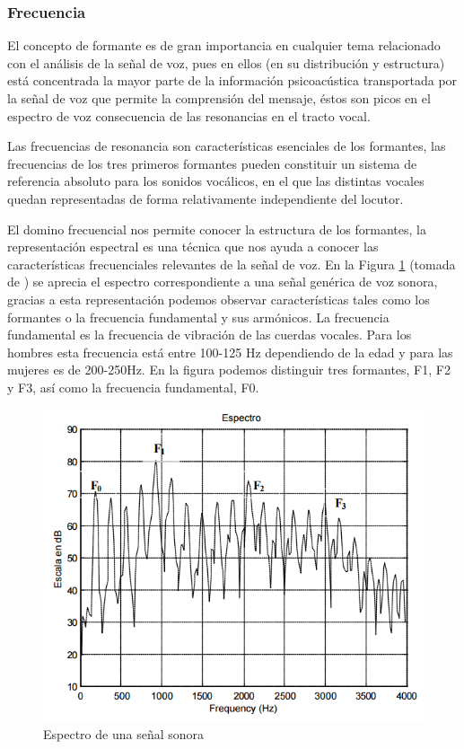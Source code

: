\subsubsection{Frecuencia}

El concepto de formante es de gran importancia en cualquier tema relacionado con el análisis de la señal de voz, pues en ellos (en su distribución y estructura) está concentrada la mayor parte de la información psicoacústica transportada por la señal de voz que permite la comprensión del mensaje, éstos son picos en el espectro de voz consecuencia de las resonancias en el tracto vocal. \cite{Mesa}

Las frecuencias de resonancia son características esenciales de los formantes, las frecuencias de los tres primeros formantes pueden constituir un sistema de referencia absoluto para los sonidos vocálicos, en el que las distintas vocales quedan representadas de forma relativamente independiente del locutor.

El domino frecuencial nos permite conocer la estructura de los formantes, la representación espectral es una técnica que nos ayuda a conocer las características frecuenciales relevantes de la señal de voz. En la Figura \ref{fig:espectroSonora} (tomada de \cite{Mesa}) se aprecia el espectro correspondiente a una señal genérica de voz sonora, gracias a esta representación podemos observar características tales como los formantes o la frecuencia fundamental y sus armónicos. La frecuencia fundamental es la frecuencia de vibración de las cuerdas vocales. Para los hombres esta frecuencia está entre 100-125 Hz dependiendo de la edad y para las mujeres es de 200-250Hz. En la figura podemos distinguir tres formantes, F1, F2 y F3, así como la frecuencia fundamental, F0.

\begin{figure}[H]
	\centering
	\includegraphics[width=0.8\linewidth]{figures/espectroSonora}
	\caption{Espectro de una señal sonora}
	\label{fig:espectroSonora}
\end{figure}

